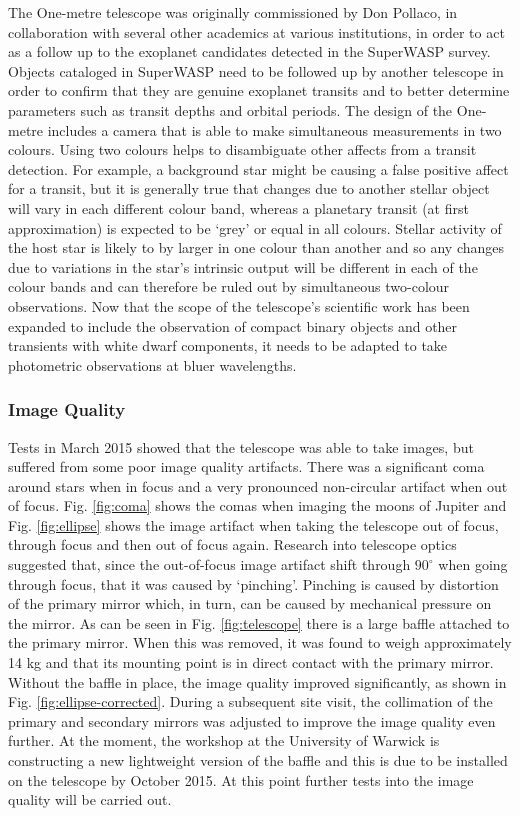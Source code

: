 \documentclass[a4paper,fleqn,usenatbib]{mnras}
\begin{document}
The One-metre telescope was originally commissioned by Don Pollaco, in collaboration with several other academics at various institutions, in order to act as a follow up to the exoplanet candidates detected in the SuperWASP \citep{PollaccoSuperWASP} survey. Objects cataloged in SuperWASP need to be followed up by another telescope in order to confirm that they are genuine exoplanet transits and to better determine parameters such as transit depths and orbital periods. The design of the One-metre includes a camera that is able to make simultaneous measurements in two colours. Using two colours helps to disambiguate other affects from a transit detection. For example, a background star might be causing a false positive affect for a transit, but it is generally true that changes due to another stellar object will vary in each different colour band, whereas a planetary transit (at first approximation) is expected to be `grey' or equal in all colours. Stellar activity of the host star is likely to by larger in one colour than another and so any changes due to variations in the star's intrinsic output will be different in each of the colour bands and can therefore be ruled out by simultaneous two-colour observations. Now that the scope of the telescope's scientific work has been expanded to include the observation of compact binary objects and other transients with white dwarf components, it needs to be adapted to take photometric observations at bluer wavelengths. 

\subsubsection{Image Quality}
Tests in March 2015 showed that the telescope was able to take images, but suffered from some poor image quality artifacts. There was a significant coma around stars when in focus and a very pronounced non-circular artifact when out of focus. Fig. \ref{fig:coma} shows the comas when imaging the moons of Jupiter and Fig. \ref{fig:ellipse} shows the image artifact when taking the telescope out of focus, through focus and then out of focus again. Research into telescope optics suggested that, since the out-of-focus image artifact shift through $90^\circ$ when going through focus, that it was caused by `pinching'. Pinching is caused by distortion of the primary mirror which, in turn, can be caused by mechanical pressure on the mirror. As can be seen in Fig. \ref{fig:telescope} there is a large baffle attached to the primary mirror. When this was removed, it was found to weigh approximately 14 kg and that its mounting point is in direct contact with the primary mirror. Without the baffle in place, the image quality improved significantly, as shown in Fig. \ref{fig:ellipse-corrected}. During a subsequent site visit, the collimation of the primary and secondary mirrors was adjusted to improve the image quality even further. At the moment, the workshop at the University of Warwick is constructing a new lightweight version of the baffle and this is due to be installed on the telescope by October 2015. At this point further tests into the image quality will be carried out.  
\end{document}
